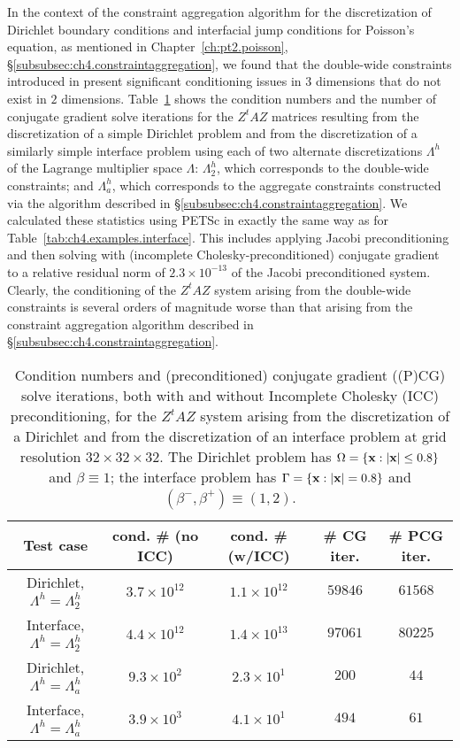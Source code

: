 In the context of the constraint aggregation algorithm for the discretization of Dirichlet boundary conditions and interfacial jump conditions for Poisson's equation, as mentioned in Chapter~\ref{ch:pt2.poisson}, \S\ref{subsubsec:ch4.constraintaggregation}, we found that the double-wide constraints introduced in \cite{Bedrossian10} present significant conditioning issues in $3$ dimensions that do not exist in $2$ dimensions. Table~\ref{tab:pt2.constraintconditioning} shows the condition numbers and the number of conjugate gradient solve iterations for the $Z^tAZ$ matrices resulting from the discretization of a simple Dirichlet problem and from the discretization of a similarly simple interface problem using each of two alternate discretizations $\Lambda^h$ of the Lagrange multiplier space $\Lambda$: $\Lambda^h_2$, which corresponds to the double-wide constraints; and $\Lambda^h_a$, which corresponds to the aggregate constraints constructed via the algorithm described in \S\ref{subsubsec:ch4.constraintaggregation}. We calculated these statistics using PETSc in exactly the same way as for Table~\ref{tab:ch4.examples.interface}. This includes applying Jacobi preconditioning and then solving with (incomplete Cholesky-preconditioned) conjugate gradient to a relative residual norm of $2.3 \times 10^{-13}$ of the Jacobi preconditioned system. Clearly, the conditioning of the $Z^tAZ$ system arising from the double-wide constraints is several orders of magnitude worse than that arising from the constraint aggregation algorithm described in \S\ref{subsubsec:ch4.constraintaggregation}.

\begin{table}[htbp]
\begin{center}
\begin{tabular}{|c|c|c|c|c|}
\hline
Test case & cond. \# (no ICC) & cond. \# (w/ICC) & \# CG iter. & \# PCG iter. \\
\hline
Dirichlet, $\Lambda^h = \Lambda^h_2$ & $3.7 \times 10^{12}$ & $1.1 \times 10^{12}$ & $59846$ & $61568$ \\
Interface, $\Lambda^h = \Lambda^h_2$ & $4.4 \times 10^{12}$ & $1.4 \times 10^{13}$ & $97061$ & $80225$ \\
Dirichlet, $\Lambda^h = \Lambda^h_a$ & $9.3 \times 10^{ 2}$ & $2.3 \times 10^{ 1}$ &   $200$ &    $44$ \\
Interface, $\Lambda^h = \Lambda^h_a$ & $3.9 \times 10^{ 3}$ & $4.1 \times 10^{ 1}$ &   $494$ &    $61$ \\
\hline
\end{tabular}
\end{center}
\caption{Condition numbers and (preconditioned) conjugate gradient ((P)CG) solve iterations, both with and without Incomplete Cholesky (ICC) preconditioning, for the $Z^tAZ$ system arising from the discretization of a Dirichlet and from the discretization of an interface problem at grid resolution $32 \times 32 \times 32$. The Dirichlet problem has $\Omega = \{\mathbf{x} : \left\lvert \mathbf{x} \right\rvert \leq 0.8\}$ and $\beta \equiv 1$; the interface problem has $\Gamma = \{\mathbf{x} : \left\lvert \mathbf{x} \right\rvert = 0.8\}$ and $(\beta^-, \beta^+) \equiv (1, 2)$.}
\label{tab:pt2.constraintconditioning}
\end{table}
